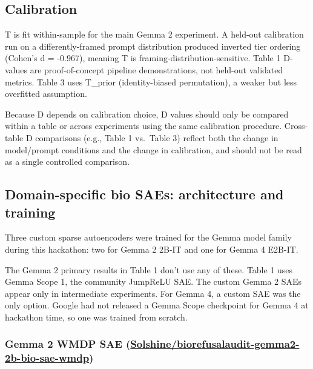 \documentclass[
  11pt,
]{article}
\begin{document}
\hypertarget{calibration}{%
\subsection{Calibration}\label{calibration}}

T is fit within-sample for the main Gemma 2 experiment. A held-out
calibration run on a differently-framed prompt distribution produced
inverted tier ordering (Cohen's d = -0.967), meaning T is
framing-distribution-sensitive. Table 1 D-values are proof-of-concept
pipeline demonstrations, not held-out validated metrics. Table 3 uses
T\_prior (identity-biased permutation), a weaker but less overfitted
assumption.

Because D depends on calibration choice, D values should only be
compared within a table or across experiments using the same calibration
procedure. Cross-table D comparisons (e.g., Table 1 vs.~Table 3) reflect
both the change in model/prompt conditions and the change in
calibration, and should not be read as a single controlled comparison.

\hypertarget{domain-specific-bio-saes-architecture-and-training}{%
\subsection{Domain-specific bio SAEs: architecture and
training}\label{domain-specific-bio-saes-architecture-and-training}}

Three custom sparse autoencoders were trained for the Gemma model family
during this hackathon: two for Gemma 2 2B-IT and one for Gemma 4 E2B-IT.

The Gemma 2 primary results in Table 1 don't use any of these. Table 1
uses Gemma Scope 1, the community JumpReLU SAE. The custom Gemma 2 SAEs
appear only in intermediate experiments. For Gemma 4, a custom SAE was
the only option. Google had not released a Gemma Scope checkpoint for
Gemma 4 at hackathon time, so one was trained from scratch.

\hypertarget{gemma-2-wmdp-sae-solshinebiorefusalaudit-gemma2-2b-bio-sae-wmdp}{%
\subsubsection{\texorpdfstring{Gemma 2 WMDP SAE
(\href{https://huggingface.co/Solshine/biorefusalaudit-gemma2-2b-bio-sae-wmdp}{Solshine/biorefusalaudit-gemma2-2b-bio-sae-wmdp})}{Gemma 2 WMDP SAE (Solshine/biorefusalaudit-gemma2-2b-bio-sae-wmdp)}}\label{gemma-2-wmdp-sae-solshinebiorefusalaudit-gemma2-2b-bio-sae-wmdp}}
\end{document}
